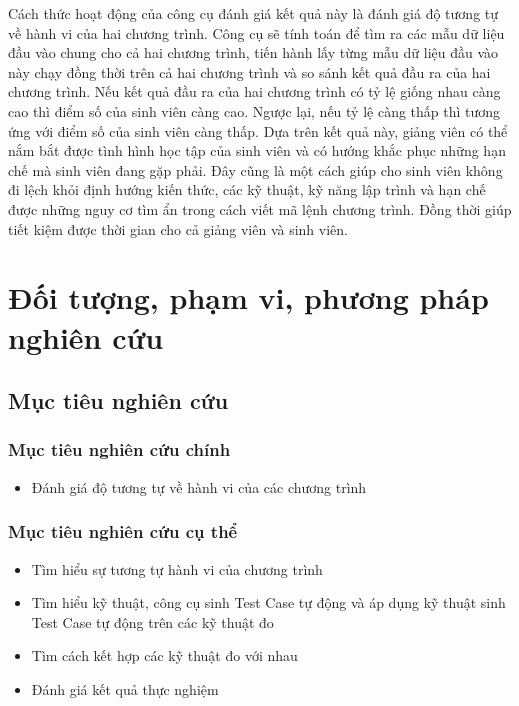 Cách thức hoạt động của công cụ đánh giá kết quả này là đánh giá độ tương tự về hành vi của hai chương trình. Công cụ sẽ tính toán để tìm ra các mẫu dữ liệu đầu vào chung cho cả hai chương trình, tiến hành lấy từng mẫu dữ liệu đầu vào này chạy đồng thời trên cả hai chương trình và so sánh kết quả đầu ra của hai chương trình. Nếu kết quả đầu ra của hai chương trình có tỷ lệ giống nhau càng cao thì điểm số của sinh viên càng cao. Ngược lại, nếu tỷ lệ càng thấp thì tương ứng với điểm số của sinh viên càng thấp. Dựa trên kết quả này, giảng viên có thể nắm bắt được tình hình học tập của sinh viên và có hướng khắc phục những hạn chế mà sinh viên đang gặp phải. Đây cũng là một cách giúp cho sinh viên không đi lệch khỏi định hướng kiến thức, các kỹ thuật, kỹ năng lập trình và hạn chế được những nguy cơ tìm ẩn trong cách viết mã lệnh chương trình. Đồng thời giúp tiết kiệm được thời gian cho cả giảng viên và sinh viên.

\section{Đối tượng, phạm vi, phương pháp nghiên cứu}
	\subsection*{Mục tiêu nghiên cứu}
		\subsubsection*{Mục tiêu nghiên cứu chính}
		\begin{itemize}
		\item Đánh giá độ tương tự về hành vi của các chương trình
		\end{itemize}
		
		\subsubsection*{Mục tiêu nghiên cứu cụ thể}
		\begin{itemize}
		\item Tìm hiểu sự tương tự hành vi của chương trình
		\item Tìm hiểu kỹ thuật, công cụ sinh Test Case tự động và áp dụng kỹ thuật sinh Test Case tự động trên các kỹ thuật đo
		\item Tìm cách kết hợp các kỹ thuật đo với nhau
		\item Đánh giá kết quả thực nghiệm
		\end{itemize}


